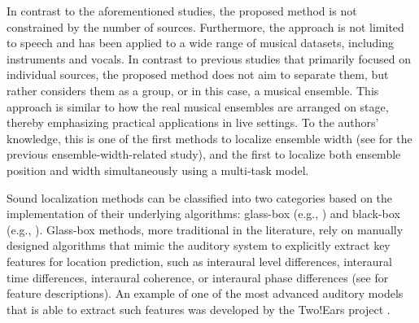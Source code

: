 \documentclass{article}
\begin{document}
In contrast to the aforementioned studies, the proposed method is not constrained by the number of sources. Furthermore, the approach is not limited to speech and has been applied to a wide range of musical datasets, including instruments and vocals. In contrast to previous studies that primarily focused on individual sources, the proposed method does not aim to separate them, but rather considers them as a group, or in this case, a musical ensemble. This approach is similar to how the real musical ensembles are arranged on stage, thereby emphasizing practical applications in live settings. To the authors' knowledge, this is one of the first methods to localize ensemble width (see \cite{antoniuk_blind_2023} for the previous ensemble-width-related study), and the first to localize both ensemble position and width simultaneously using a multi-task model.


Sound localization methods can be classified into two categories based on the implementation of their underlying algorithms: glass-box (e.g., \parencite{dietz_auditory_2011, may_probabilistic_2011, may_binaural_2012, may_robust_2015, woodruff_binaural_2012, ma16c_interspeech, ma_exploiting_2017, ma_robust_2018}) and black-box (e.g., \parencite{vera-diaz_towards_2018, vera-diaz_towards_2018, yang_deepear_2022}). Glass-box methods, more traditional in the literature, rely on manually designed algorithms that mimic the auditory system to explicitly extract key features for location prediction, such as interaural level differences, interaural time differences, interaural coherence, or interaural phase differences (see \cite{blauert_spatial_1996} for feature descriptions). An example of one of the most advanced auditory models that is able to extract such features was developed by the Two!Ears project \parencite{raake_computational_nodate}.
\end{document}
